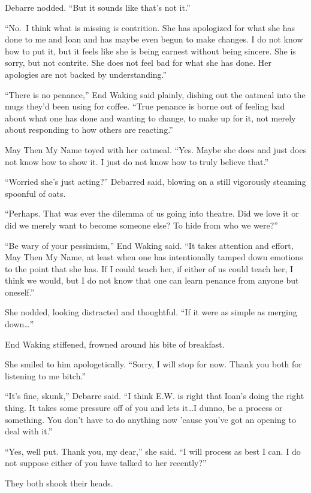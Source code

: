 Debarre nodded. ``But it sounds like that's not it.''

``No.~I think what is missing is contrition. She has apologized for what she has done to me and Ioan and has maybe even begun to make changes. I do not know how to put it, but it feels like she is being earnest without being sincere. She is sorry, but not contrite. She does not feel bad for what she has done. Her apologies are not backed by understanding.''

``There is no penance,'' End Waking said plainly, dishing out the oatmeal into the mugs they'd been using for coffee. ``True penance is borne out of feeling bad about what one has done and wanting to change, to make up for it, not merely about responding to how others are reacting.''

May Then My Name toyed with her oatmeal. ``Yes. Maybe she does and just does not know how to show it. I just do not know how to truly believe that.''

``Worried she's just acting?'' Debarred said, blowing on a still vigorously steaming spoonful of oats.

``Perhaps. That was ever the dilemma of us going into theatre. Did we love it or did we merely want to become someone else? To hide from who we were?''

``Be wary of your pessimism,'' End Waking said. ``It takes attention and effort, May Then My Name, at least when one has intentionally tamped down emotions to the point that she has. If I could teach her, if either of us could teach her, I think we would, but I do not know that one can learn penance from anyone but oneself.''

She nodded, looking distracted and thoughtful. ``If it were as simple as merging down\ldots{}''

End Waking stiffened, frowned around his bite of breakfast.

She smiled to him apologetically. ``Sorry, I will stop for now. Thank you both for listening to me bitch.''

``It's fine, skunk,'' Debarre said. ``I think E.W. is right that Ioan's doing the right thing. It takes some pressure off of you and lets it\ldots I dunno, be a process or something. You don't have to do anything now 'cause you've got an opening to deal with it.''

``Yes, well put. Thank you, my dear,'' she said. ``I will process as best I can. I do not suppose either of you have talked to her recently?''

They both shook their heads.

